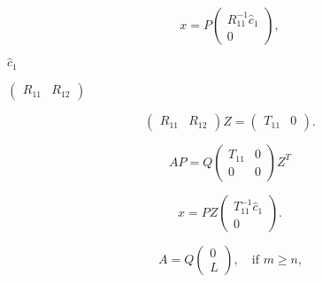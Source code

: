 {\newpage\clearpage
{}%
\begin{displaymath}
x = P \left( \begin{array}{c} R_{11}^{-1} \hat{c}_1 \\0 \end{array} \right),
\end{displaymath}%
\lthtmldisplayZ
\lthtmlcheckvsize\clearpage}

{\newpage\clearpage
{}%
$\hat{c}_1$%
\lthtmlinlinemathZ
\lthtmlcheckvsize\clearpage}

{\newpage\clearpage
{}%
$\left( \begin{array}{cc}R_{11} & R_{12}\end{array} \right)$%
\lthtmlinlinemathZ
\lthtmlcheckvsize\clearpage}

{\newpage\clearpage
{}%
\begin{displaymath}
\left( \begin{array}{cc}R_{11} & R_{12}\end{array}\right) Z =
\left( \begin{array}{cc}T_{11} & 0\end{array}\right) .
\end{displaymath}%
\lthtmldisplayZ
\lthtmlcheckvsize\clearpage}

{\newpage\clearpage
{}%
\begin{displaymath}
A P = Q \left(
\begin{array}{cc}T_{11} & 0 \\0 & 0\end{array}
\right) Z^{T}
\end{displaymath}%
\lthtmldisplayZ
\lthtmlcheckvsize\clearpage}

{\newpage\clearpage
{}%
\begin{displaymath}
x = P Z \left( \begin{array}{c} T_{11}^{-1} \hat{c}_1 \\0\end{array}\right) .
\end{displaymath}%
\lthtmldisplayZ
\lthtmlcheckvsize\clearpage}

{\newpage\clearpage
{}%
\begin{displaymath}
A = Q \left( \begin{array}{c} 0 \\L \end{array} \right) ,
\quad \mbox{if $m \geq n$,}
\end{displaymath}%
\lthtmldisplayZ
\lthtmlcheckvsize\clearpage}

